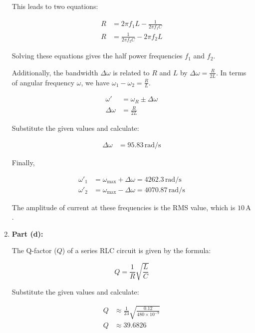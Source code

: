 \documentclass[journal,12pt,twocolumn]{IEEEtran}
\theoremstyle{remark}
\begin{document}
\begin{enumerate}
    This leads to two equations:

    \begin{align}
        R &= 2\pi f_1 L - \frac{1}{2\pi f_1 C} \\
        R &= \frac{1}{2\pi f_2 C} - 2\pi f_2 L
    \end{align}

    Solving these equations gives the half power frequencies \(f_1\) and \(f_2\).

    Additionally, the bandwidth \(\Delta\omega\) is related to \(R\) and \(L\) by \(\Delta\omega = \frac{R}{2L}\). In terms of angular frequency \(\omega\), we have \(\omega_1 - \omega_2 = \frac{R}{L}\).

    \begin{align}
        \omega' &= \omega_R \pm \Delta\omega \\
        \Delta\omega &= \frac{R}{2L}
    \end{align}

    Substitute the given values and calculate:

    \begin{align}
        \Delta\omega &= 95.83 \, \text{rad/s}
    \end{align}

    Finally,

    \begin{align}
        \omega'_1 &= \omega_{\text{max}} + \Delta\omega = 4262.3 \, \text{rad/s} \\
        \omega'_2 &= \omega_{\text{max}} - \Delta\omega = 4070.87 \, \text{rad/s}
    \end{align}

    The amplitude of current at these frequencies is the RMS value, which is \(10 \, \text{A}\).

    \item \textbf{Part (d):}

    The Q-factor (\(Q\)) of a series RLC circuit is given by the formula:

    \[Q = \frac{1}{R} \sqrt{\frac{L}{C}} \label{eq:Qfact}\]

    Substitute the given values and calculate:

    \begin{align}
        Q &\approx \frac{1}{23} \sqrt{\frac{0.12}{480 \times 10^{-9}}} \\
        Q &\approx 39.6826 
    \end{align}
\end{enumerate}
\end{document}
